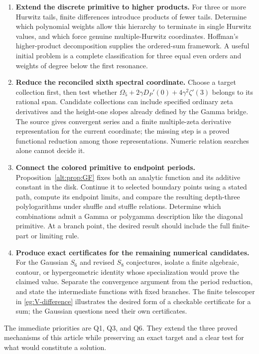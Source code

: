 \documentclass[11pt]{article}
\theoremstyle{definition}
\theoremstyle{remark}
\numberwithin{equation}{section}
\begin{document}
\begin{enumerate}[label=\textbf{Q\arabic*.},ref=Q\arabic*,itemsep=10pt]
\item \textbf{Extend the discrete primitive to higher products.}
For three or more Hurwitz tails, finite differences introduce products
of fewer tails. Determine which polynomial weights allow this
hierarchy to terminate in single Hurwitz values, and which force
genuine multiple-Hurwitz coordinates. Hoffman's higher-product
decomposition \cite{Hoffman} supplies the ordered-sum framework.
A useful initial problem is a complete classification for three
equal even orders and weights of degree below the first resonance.

\item \textbf{Reduce the reconciled sixth spectral coordinate.}
Choose a target collection first, then test whether
$\Omega_5+2\gamma D_P'(0)+4\gamma^2\zeta'(3)$ belongs to its
rational span. Candidate collections can include specified ordinary
zeta derivatives and the height-one slopes already defined by the
Gamma bridge. The source gives convergent series and a finite
multiple-zeta derivative representation for the current coordinate;
the missing step is a proved functional reduction among those
representations. Numeric relation searches alone cannot decide it.

\item \textbf{Connect the colored primitive to endpoint periods.}
Proposition~\ref{alt:prop:GF} fixes both an analytic function and its
additive constant in the disk. Continue it to selected boundary
points using a stated path, compute its endpoint limits, and compare
the resulting depth-three polylogarithms under shuffle and stuffle
relations. Determine which combinations admit a Gamma or polygamma
description like the diagonal primitive. At a branch point, the
desired result should include the full finite-part or limiting rule.

\item \textbf{Produce exact certificates for the remaining numerical candidates.}
For the Gaussian $S_6$ and revised $S_8$ conjectures, isolate a finite
algebraic, contour, or hypergeometric identity whose specialization
would prove the claimed value. Separate the convergence argument
from the period reduction, and state the intermediate functions with
fixed branches. The finite telescoper in \eqref{eg:V-difference}
illustrates the desired form of a checkable certificate for a sum;
the Gaussian questions need their own certificates.
\end{enumerate}

The immediate priorities are Q1, Q3, and Q6. They extend the three
proved mechanisms of this article while preserving an exact target
and a clear test for what would constitute a solution.
\end{document}
